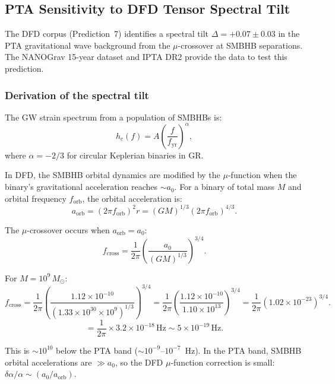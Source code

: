 \documentclass[11pt]{article}
\theoremstyle{definition}
\theoremstyle{remark}
\newcommand{\ee}[1]{\times10^{#1}}
\newcommand{\Msun}{M_\odot}
\newcommand{\azero}{a_0}
\begin{document}
\subsection{PTA Sensitivity to DFD Tensor Spectral Tilt}

The DFD corpus (Prediction~7) identifies a spectral tilt
$\Delta = +0.07 \pm 0.03$ in the PTA gravitational wave background
from the $\mu$-crossover at SMBHB separations. The NANOGrav 15-year
dataset and IPTA DR2 provide the data to test this prediction.

\subsubsection{Derivation of the spectral tilt}

The GW strain spectrum from a population of SMBHBs is:
\begin{equation}
h_c(f) = A \left(\frac{f}{f_{\mathrm{yr}}}\right)^{\alpha},
\end{equation}
where $\alpha = -2/3$ for circular Keplerian binaries in GR.

In DFD, the SMBHB orbital dynamics are modified by the $\mu$-function
when the binary's gravitational acceleration reaches $\sim \azero$.
For a binary of total mass $M$ and orbital frequency $f_{\mathrm{orb}}$,
the orbital acceleration is:
\begin{equation}
a_{\mathrm{orb}} = (2\pi f_{\mathrm{orb}})^2 r
= (GM)^{1/3} (2\pi f_{\mathrm{orb}})^{4/3}.
\end{equation}

The $\mu$-crossover occurs when $a_{\mathrm{orb}} = \azero$:
\begin{equation}
f_{\mathrm{cross}} = \frac{1}{2\pi} \left(\frac{\azero}{(GM)^{1/3}}\right)^{3/4}.
\end{equation}

For $M = 10^9\,\Msun$:
\begin{equation}
f_{\mathrm{cross}} = \frac{1}{2\pi}
\left(\frac{1.12\ee{-10}}{(1.33\ee{30} \times 10^9)^{1/3}}\right)^{3/4}
= \frac{1}{2\pi}
\left(\frac{1.12\ee{-10}}{1.10\ee{13}}\right)^{3/4}
= \frac{1}{2\pi} (1.02\ee{-23})^{3/4}.
\end{equation}
\begin{equation}
= \frac{1}{2\pi} \times 3.2\ee{-18}\,\mathrm{Hz}
\sim 5\ee{-19}\,\mathrm{Hz}.
\end{equation}

This is $\sim 10^{10}$ below the PTA band ($\sim 10^{-9}$--$10^{-7}$~Hz).
In the PTA band, SMBHB orbital accelerations are $\gg \azero$,
so the DFD $\mu$-function correction is small:
$\delta \alpha / \alpha \sim (\azero / a_{\mathrm{orb}})$.
\end{document}
